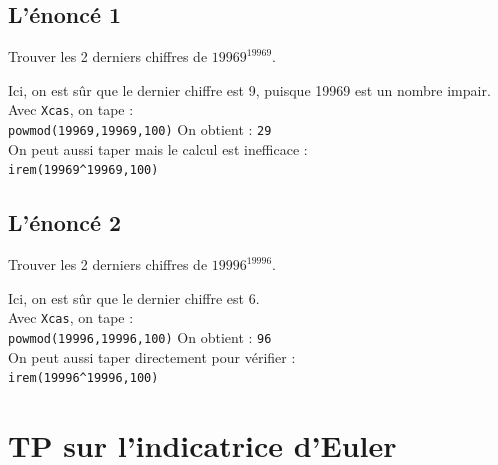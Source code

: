 \documentclass[a4paper,11pt]{book}
\begin{document}
\subsection{L'\'enonc\'e 1}
Trouver les 2 derniers chiffres de $19969^{19969}$.

Ici, on est s\^ur que le dernier chiffre est 9, puisque 19969 est un nombre 
impair.\\
Avec {\tt Xcas}, on tape :\\
{\tt powmod(19969,19969,100)}
On obtient : {\tt 29}\\
On peut aussi taper mais le calcul est inefficace :\\
{\tt irem(19969\verb|^|19969,100)}
\subsection{L'\'enonc\'e 2}
Trouver les 2 derniers chiffres de $19996^{19996}$.

Ici, on est s\^ur que le dernier chiffre est 6.\\
Avec {\tt Xcas}, on tape :\\
{\tt powmod(19996,19996,100)}
On obtient : {\tt 96}\\
On peut aussi taper directement pour v\'erifier :\\
{\tt irem(19996\verb|^|19996,100)}

\section{{\bf TP} sur l'indicatrice d'Euler}
\end{document}
